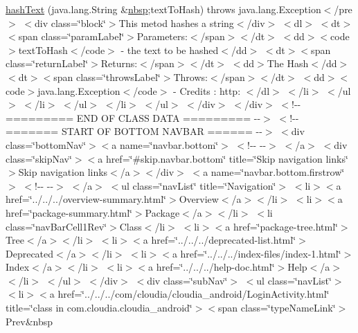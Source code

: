 \begin{DoxyCompactItemize}
\hyperlink{_login_activity_8_user_login_task_8html_a806ea3dd4c5862264b29e36871c56475}{hash\-Text} (java.\-lang.\-String \&\hyperlink{_tools_8html_aef915316f784c9063d942974538301a6}{nbsp};text\-To\-Hash)  throws java.\-lang.\-Exception$<$/pre$>$ $<$div class=\char`\"{}block\char`\"{}$>$\-This metod hashes a string$<$/div$>$ $<$dl$>$ $<$dt$>$$<$span class=\char`\"{}param\-Label\char`\"{}$>$\-Parameters\-:$<$/span$>$$<$/dt$>$ $<$dd$>$$<$code$>$text\-To\-Hash$<$/code$>$ -\/ the text to be hashed$<$/dd$>$ $<$dt$>$$<$span class=\char`\"{}return\-Label\char`\"{}$>$\-Returns\-:$<$/span$>$$<$/dt$>$ $<$dd$>$\-The Hash$<$/dd$>$ $<$dt$>$$<$span class=\char`\"{}throws\-Label\char`\"{}$>$\-Throws\-:$<$/span$>$$<$/dt$>$ $<$dd$>$$<$code$>$java.\-lang.\-Exception$<$/code$>$ -\/ Credits \-: http\-: $<$/dl$>$ $<$/li$>$ $<$/ul$>$ $<$/li$>$ $<$/ul$>$ $<$/li$>$ $<$/ul$>$ $<$/div$>$ $<$/div$>$ $<$!-\/-\/ ========= E\-N\-D O\-F C\-L\-A\-S\-S D\-A\-T\-A ========= -\/-\/$>$ $<$!-\/-\/ ======= S\-T\-A\-R\-T O\-F B\-O\-T\-T\-O\-M N\-A\-V\-B\-A\-R ====== -\/-\/$>$ $<$div class=\char`\"{}bottom\-Nav\char`\"{}$>$$<$a name=\char`\"{}navbar.\-bottom\char`\"{}$>$ $<$!-\/-\/   -\/-\/$>$ $<$/a$>$ $<$div class=\char`\"{}skip\-Nav\char`\"{}$>$$<$a href=\char`\"{}\#skip.\-navbar.\-bottom\char`\"{} title=\char`\"{}\-Skip navigation links\char`\"{}$>$\-Skip navigation links$<$/a$>$$<$/div$>$ $<$a name=\char`\"{}navbar.\-bottom.\-firstrow\char`\"{}$>$ $<$!-\/-\/   -\/-\/$>$ $<$/a$>$ $<$ul class=\char`\"{}nav\-List\char`\"{} title=\char`\"{}\-Navigation\char`\"{}$>$ $<$li$>$$<$a href=\char`\"{}../../../overview-\/summary.\-html\char`\"{}$>$\-Overview$<$/a$>$$<$/li$>$ $<$li$>$$<$a href=\char`\"{}package-\/summary.\-html\char`\"{}$>$\-Package$<$/a$>$$<$/li$>$ $<$li class=\char`\"{}nav\-Bar\-Cell1\-Rev\char`\"{}$>$\-Class$<$/li$>$ $<$li$>$$<$a href=\char`\"{}package-\/tree.\-html\char`\"{}$>$\-Tree$<$/a$>$$<$/li$>$ $<$li$>$$<$a href=\char`\"{}../../../deprecated-\/list.\-html\char`\"{}$>$\-Deprecated$<$/a$>$$<$/li$>$ $<$li$>$$<$a href=\char`\"{}../../../index-\/files/index-\/1.\-html\char`\"{}$>$\-Index$<$/a$>$$<$/li$>$ $<$li$>$$<$a href=\char`\"{}../../../help-\/doc.\-html\char`\"{}$>$\-Help$<$/a$>$$<$/li$>$ $<$/ul$>$ $<$/div$>$ $<$div class=\char`\"{}sub\-Nav\char`\"{}$>$ $<$ul class=\char`\"{}nav\-List\char`\"{}$>$ $<$li$>$$<$a href=\char`\"{}../../../com/cloudia/cloudia\-\_\-android/\-Login\-Activity.\-html\char`\"{} title=\char`\"{}class in com.\-cloudia.\-cloudia\-\_\-android\char`\"{}$>$$<$span class=\char`\"{}type\-Name\-Link\char`\"{}$>$\-Prev\&nbsp
\end{DoxyCompactItemize}
